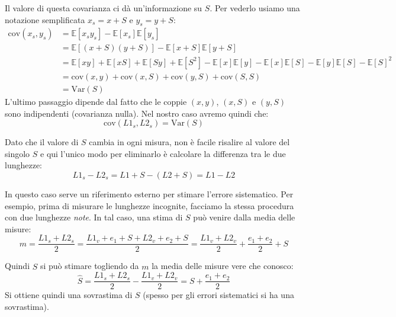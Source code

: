 \documentclass[openany,a4paper,12pt]{book}
\theoremstyle{remark}
\begin{document}
Il valore di questa covarianza ci dà un'informazione su $S$. Per vederlo usiamo una notazione semplificata $x_s = x + S$ e $y_s = y + S$:
\begin{align*}
\text{cov}(x_s, y_s) &= \mathbb{E}[x_s y_s] - \mathbb{E}[x_s]\mathbb{E}[y_s] \\
&= \mathbb{E}[(x+S)(y+S)] - \mathbb{E}[x+S]\mathbb{E}[y+S] \\
&= \mathbb{E}[xy] + \mathbb{E}[xS] + \mathbb{E}[Sy] + \mathbb{E}[S^2] - \mathbb{E}[x]\mathbb{E}[y] - \mathbb{E}[x]\mathbb{E}[S] - \mathbb{E}[y]\mathbb{E}[S] - \mathbb{E}[S]^2 \\
&= \text{cov}(x,y) + \text{cov}(x,S) + \text{cov}(y,S) + \text{cov}(S,S) \\
&= \text{Var}(S)
\end{align*}
L'ultimo passaggio dipende dal fatto che le coppie $(x,y)$, $(x,S)$ e $(y,S)$ sono indipendenti (covarianza nulla).
Nel nostro caso avremo quindi che:
\begin{equation}
\text{cov}(L1_s, L2_s) = \text{Var}(S)
\end{equation}

Dato che il valore di $S$ cambia in ogni misura, non è facile risalire al valore del singolo $S$ e qui l'unico modo per eliminarlo è calcolare la differenza tra le due lunghezze:
\begin{equation*}
L1_s - L2_s = L1 + S - (L2 + S) = L1 - L2
\end{equation*}

In questo caso serve un riferimento esterno per stimare l'errore sistematico. Per esempio, prima di misurare le lunghezze incognite, facciamo la stessa procedura con due lunghezze \emph{note}. In tal caso, una stima di $S$ può venire dalla media delle misure:
\begin{equation*}
m = \frac{L1_s + L2_s}{2} = \frac{L1_v + e_1 + S + L2_v + e_2 + S}{2} = \frac{L1_v + L2_v}{2} + \frac{e_1 + e_2}{2} + S
\end{equation*}

Quindi $\hat{S}$ si può stimare togliendo da $m$ la media delle misure vere che conosco:
\begin{equation}
\hat{S} = \frac{L1_s + L2_s}{2} - \frac{L1_v + L2_v}{2} = S + \frac{e_1 + e_2}{2}
\end{equation}
Si ottiene quindi una sovrastima di $S$ (spesso per gli errori sistematici si ha una sovrastima).
\end{document}

